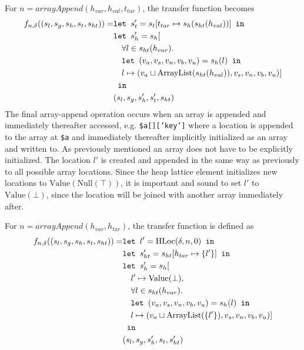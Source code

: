 For $n = \mathit{arrayAppend}(h_{var}, h_{val},t_{tar})$, the transfer function becomes
\begin{align}
    f_{n,\delta}((s_l, s_g, s_h, s_t, s_{ht})) = &\texttt{let } s_t' = s_t[t_{tar}\mapsto s_h(s_{ht}(h_{val}))] \texttt{ in }\notag\\
                              &\texttt{let } s_h' = s_h[\notag\\
                              &\quad \forall l \in s_{ht}(h_{var}).\notag\\
                              &\quad\texttt{let } (v_a,v_s,v_n,v_b,v_u) = s_h(l) \texttt{ in } \notag\\
                              &\quad l\mapsto (v_a \sqcup \text{ArrayList}(s_{ht}(h_{val})), v_s, v_n, v_b, v_u)]\notag\\
                              & \texttt{ in }\notag\\
                              &(s_l, s_g, s_h', s_t', s_{ht})
\end{align}
The final array-append operation occurs when an array is appended and immediately thereafter accessed, e.g. \texttt{\$a[]['key']} where a location is appended to the array at \texttt{\$a} and immediately  thereafter implicitly initialized as an array and written to. As previously mentioned an array does not have to be explicitly initialized. The location $l'$ is created and appended in the same way as previously to all possible array locations. Since the heap lattice element initializes new locations to $\text{Value}(\text{Null}(\top))$, it is important and sound to set $l'$ to $\text{Value}(\bot)$, since the location will be joined with another array immediately after. 

For $n = \mathit{arrayAppend}(h_{var}, h_{tar})$, the transfer function is defined as
\begin{align}
    f_{n,\delta}((s_l, s_g, s_h, s_t, s_{ht})) = &\texttt{let } l' = \text{HLoc}(\delta, n, 0) \texttt{ in }\notag\\
                              &\texttt{let } s_{ht}' = s_{ht}[h_{tar} \mapsto \{l'\}] \texttt{ in }\notag\\
                              &\texttt{let } s_h' = s_h[\notag\\
                              &\quad l' \mapsto \text{Value}(\bot), \notag\\
                              &\quad \forall l \in s_{ht}(h_{var}).\notag\\
                              &\quad\texttt{let } (v_a,v_s,v_n,v_b,v_u) = s_h(l) \texttt{ in } \notag\\
                              &\quad l\mapsto (v_a \sqcup \text{ArrayList}(\{l'\}), v_s, v_n, v_b, v_u)]\notag\\
                              & \texttt{ in }\notag\\
                              &(s_l, s_g, s_h', s_t, s_{ht}')
\end{align}
\begin{comment}
\begin{program}
\centering
\begin{lstlisting}
$a = [];
$a[]["foo"] = 42;
\end{lstlisting}
\caption{Array append before write}
\label{lst:appendbefw}
\end{program}
\end{comment}
